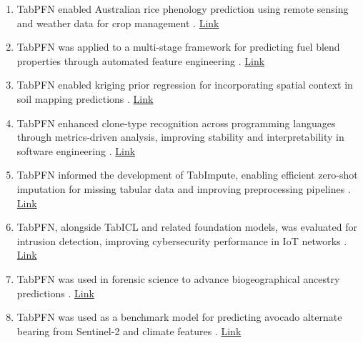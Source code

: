 \begin{enumerate}
\item TabPFN enabled Australian rice phenology prediction using remote sensing and weather data for crop management \cite{other_usecase8_rice_phenology_tabpfn}. \href{https://www.mdpi.com/2072-4292/17/17/3050}{Link}

\item TabPFN was applied to a multi-stage framework for predicting fuel blend properties through automated feature engineering \cite{other_usecase9_fuel_blend_framework}. \href{https://chemrxiv.org/engage/chemrxiv/article-details/68dc888d3e708a7649ff0ec9}{Link}

\item TabPFN enabled kriging prior regression for incorporating spatial context in soil mapping predictions \cite{other_usecase10_kriging_prior_regression}. \href{https://arxiv.org/abs/2509.09408}{Link}

\item TabPFN enhanced clone-type recognition across programming languages through metrics-driven analysis, improving stability and interpretability in software engineering \cite{other_usecase12_clone_type}. \href{https://wiley.authorea.com/users/980519/articles/1346750-metrics-first-language-aware-clone-type-recognition-auditable-signals-across-c-c-java-and-python}{Link}

\item TabPFN informed the development of TabImpute, enabling efficient zero-shot imputation for missing tabular data and improving preprocessing pipelines \cite{other_usecase14_tabimpute}. \href{https://www.arxiv.org/abs/2510.02625}{Link}

\item TabPFN, alongside TabICL and related foundation models, was evaluated for intrusion detection, improving cybersecurity performance in IoT networks \cite{other_usecase16_cyber_fm_tabpfn_tabicl}. \href{https://www.mdpi.com/2079-9292/14/19/3792}{Link}

\item TabPFN was used in forensic science to advance biogeographical ancestry predictions \cite{Heinzel2025}. \href{https://www.sciencedirect.com/science/article/pii/S1872497325000705}{Link}

\item TabPFN was used as a benchmark model for predicting avocado alternate bearing from Sentinel-2 and climate features \cite{other_usecase21_avocado_alt_bearing}. \href{https://www.preprints.org/manuscript/202510.2413}{Link}

\end{enumerate}
